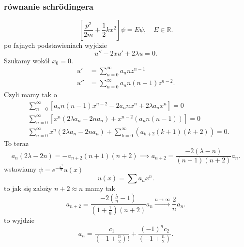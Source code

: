 \documentclass[../main.tex]{subfiles}
\begin{document}
\subsubsection{równanie schrödingera}
\[
    \left[ \frac{p^2}{2m} + \frac{1}{2}kx^2 \right] \psi = E \psi,\quad E\in \mathbb{R}
.\]
po fajnych podstawieniach wyjdzie
\[
    u'' - 2xu' + 2\lambda u = 0
.\]
Szukamy wokół $x_0 = 0$.
\begin{align*}
    u' &= \sum_{n=0}^{\infty} a_nn z^{n-1}\\
    u'' &= \sum_{n=0}^{\infty} a_n n (n-1) z^{n-2}
.\end{align*}
Czyli mamy tak o
\begin{align*}
    &\sum_{n=0}^{\infty} \left[ a_n n (n-1)x^{n-2} - 2 a_n n x^n + 2\lambda a_n x^n \right] = 0\\
    &\sum_{n=0}^{\infty} \left[ x^n\left( 2\lambda a_n - 2n a_n \right) + x^{n-2}\left( a_n n(n-1) \right)  \right] = 0\\
    &\sum_{n=0}^{\infty} x^n(2\lambda a_n - 2n a_n) + \sum_{k=0}^{\infty} (a_{k+2} (k+1)(k+2)) = 0
.\end{align*}
To teraz
\[
    a_n(2\lambda - 2n) = -a_{n+2}(n+1)(n+2) \implies a_{n+2} = \frac{-2(\lambda - n)}{(n+1)(n+2)} a_n
.\]
wstawiamy $\psi = e ^{-\frac{x^2}{2}}u(x)$
\[
    u(x) = \sum a_nx^n
.\]
to jak się założy  $n+2 \approx n$ mamy tak
\[
    a_{n+2} = \frac{-2\left( \frac{\lambda}{n} - 1 \right) }{\left( 1+\frac{1}{n} \right) \left( n+2 \right) } a_n \overset{n\to \infty}{\longrightarrow} \frac{2}{n}a_n
.\]
to wyjdzie
\[
    a_n = \frac{c_1}{(-1 + \frac{n}{2})!} + \frac{(-1)^n c_2}{(-1 + \frac{n}{2})}
.\]
\end{document}
